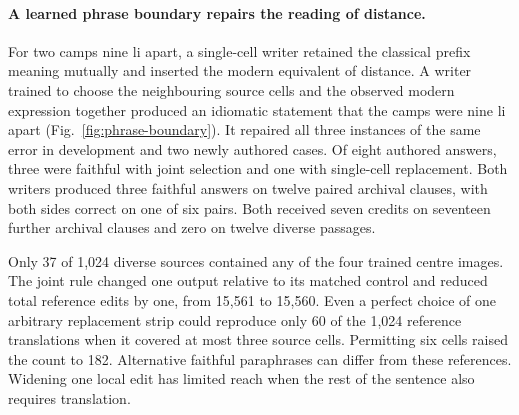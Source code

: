 \paragraph{A learned phrase boundary repairs the reading of distance.}
For two camps nine li apart, a single-cell writer retained the classical prefix meaning mutually and inserted the modern equivalent of distance. A writer trained to choose the neighbouring source cells and the observed modern expression together produced an idiomatic statement that the camps were nine li apart (Fig.~\ref{fig:phrase-boundary}). It repaired all three instances of the same error in development and two newly authored cases. Of eight authored answers, three were faithful with joint selection and one with single-cell replacement. Both writers produced three faithful answers on twelve paired archival clauses, with both sides correct on one of six pairs. Both received seven credits on seventeen further archival clauses and zero on twelve diverse passages.

Only 37 of 1,024 diverse sources contained any of the four trained centre images. The joint rule changed one output relative to its matched control and reduced total reference edits by one, from 15,561 to 15,560. Even a perfect choice of one arbitrary replacement strip could reproduce only 60 of the 1,024 reference translations when it covered at most three source cells. Permitting six cells raised the count to 182. Alternative faithful paraphrases can differ from these references. Widening one local edit has limited reach when the rest of the sentence also requires translation.
